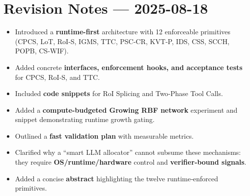 \documentclass[
]{article}
\author{}
\date{}
\providecommand{\tightlist}{%
  \setlength{\itemsep}{0pt}\setlength{\parskip}{0pt}}
\begin{document}
\hypertarget{revision-notes-2025-08-18}{%
\section{Revision Notes ---
2025-08-18}\label{revision-notes-2025-08-18}}

\begin{itemize}
\tightlist
\item
  Introduced a \textbf{runtime-first} architecture with 12 enforceable
  primitives (CPCS, LoT, RoI‑S, IGMS, TTC, PSC‑CR, KVT‑P, IDS, CSS,
  SCCH, POPB, CS‑WIF).
\item
  Added concrete \textbf{interfaces, enforcement hooks, and acceptance
  tests} for CPCS, RoI‑S, and TTC.
\item
  Included \textbf{code snippets} for RoI Splicing and Two‑Phase Tool
  Calls.
\item
  Added a \textbf{compute-budgeted Growing RBF network} experiment and
  snippet demonstrating runtime growth gating.
\item
  Outlined a \textbf{fast validation plan} with measurable metrics.
\item
  Clarified why a ``smart LLM allocator'' cannot subsume these
  mechanisms: they require \textbf{OS/runtime/hardware} control and
  \textbf{verifier‑bound signals}.
\item
  Added a concise \textbf{abstract} highlighting the twelve
  runtime‑enforced primitives.
\end{itemize}
\end{document}
